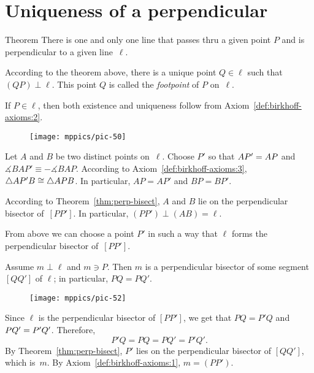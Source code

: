 \section{Uniqueness of a perpendicular}

\begin{thm}[\abs]{Theorem}\label{perp:ex+un}
There is one and only one line that passes thru a given point $P$ and is perpendicular to a given line~$\ell$.
\end{thm}

According to the theorem above, 
there is a unique point $Q\in\ell$ such that $(QP)\perp\ell$.
This point $Q$ is called the \emph{footpoint} of $P$ on~$\ell$. 

If $P\in\ell$, then both existence and uniqueness follow from Axiom~\ref{def:birkhoff-axioms:2}.

{

\begin{wrapfigure}{o}{30mm}
\vskip-4mm
\centering
\texttt{[image: mppics/pic-50]}
\end{wrapfigure}

Let $A$ and $B$ be two distinct points on~$\ell$. 
Choose $P'$ so that $AP'=AP$ and $\measuredangle  BAP' \equiv -\measuredangle   BAP$.
According to Axiom~\ref{def:birkhoff-axioms:3}, $\triangle A P' B\cong\triangle A P B$.
In particular, $A P= A P'$ and $B P= B P'$.

According to Theorem~\ref{thm:perp-bisect}, $A$ and $B$ lie on the perpendicular bisector of~$[P P']$.
In particular, $(P P')\perp (A B)=\ell$.

}


From above we can choose a point $P'$ in such a way that $\ell$ forms the perpendicular bisector of~$[PP']$.

Assume $m\perp \ell$ and $m\ni P$.
Then $m$ is a perpendicular bisector of some segment $[Q Q']$ of $\ell$;
in particular, $P Q= P Q'$.

{

\begin{wrapfigure}{r}{37mm}
\centering
\texttt{[image: mppics/pic-52]}
\end{wrapfigure}

Since $\ell$ is the perpendicular bisector of $[P P']$,
we get that $PQ= P'Q$ and $PQ' = P'Q'$.
Therefore, 
$$P' Q=P Q=P Q'= P' Q'.$$
By Theorem~\ref{thm:perp-bisect}, 
$P'$ lies on the perpendicular bisector of $[QQ']$, which is~$m$.
By Axiom~\ref{def:birkhoff-axioms:1}, $m=(P P')$.
\qeds

}

